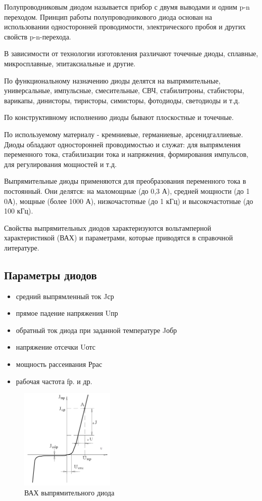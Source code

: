 \documentclass[unicode, 12pt, a4paper, oneside]{article}
\begin{document}
Полупроводниковым диодом называется прибор с двумя выводами и одним p-n переходом. Принцип работы полупроводникового диода основан на использовании односторонней проводимости, электрического пробоя и других свойств p-n-перехода.

В зависимости от технологии изготовления различают точечные диоды, сплавные, микросплавные, эпитаксиальные и другие.

По функциональному назначению диоды делятся на выпрямительные, универсальные, импульсные, смесительные, СВЧ, стабилитроны, стабисторы, варикапы, динисторы, тиристоры, симисторы, фотодиоды, светодиоды и т.д.

По конструктивному исполнению диоды бывают плоскостные и точечные.

По используемому материалу - кремниевые, германиевые, арсенидгаллиевые. Диоды обладают односторонней проводимостью и служат: для выпрямления переменного тока, стабилизации тока и напряжения, формирования импульсов, для регулирования мощностей и т.д.

Выпрямительные диоды применяются для преобразования переменного тока в постоянный. Они делятся: на маломощные (до 0,3 А), средней мощности (до 1 0А), мощные (более 1000 А), низкочастотные (до 1 кГц) и высокочастотные (до 100 кГц).

Свойства выпрямительных диодов характеризуются вольтамперной характеристикой (ВАХ) и параметрами, которые приводятся в справочной литературе.

\subsection*{Параметры диодов}

\begin{itemize}
\item средний выпрямленный ток Jср
\item прямое падение напряжения Uпр
\item обратный ток диода при заданной температуре Jобр
\item напряжение отсечки Uотс
\item мощность рассеивания Ррас
\item рабочая частота fр. и др.
\end{itemize}

\begin{figure}[htbp]
\centering
\includegraphics[width=0.4\textwidth]{2_VAC_of_diod.png}
\caption{ВАХ выпрямительного диода}
\label{fig:2_VAC_of_diod}
\end{figure}
\end{document}
